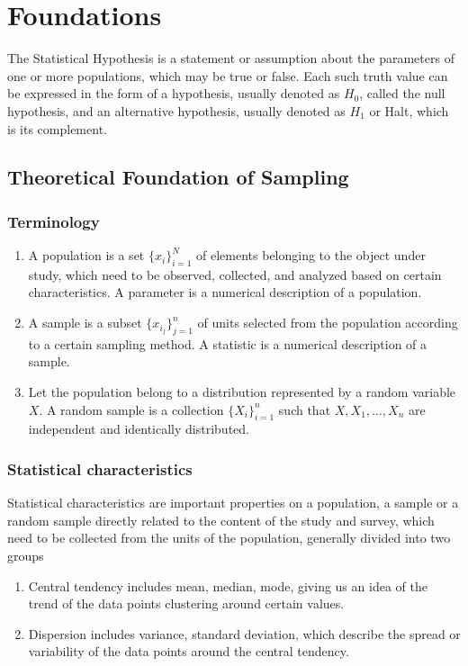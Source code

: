 \chapter{Foundations}

The Statistical Hypothesis is a statement or assumption about the parameters of one or more populations, which may be true or false. Each such truth value can be expressed in the form of a hypothesis, usually denoted as $H_0$, called the null hypothesis, and an alternative hypothesis, usually denoted as $H_1$ or Halt, which is its complement.

\section{Theoretical Foundation of Sampling}
\subsection{Terminology}
\begin{enumerate}
 \item A population is a set $\{x_i\}_{i=1}^N$ of elements belonging to the object under study, which need to be observed, collected, and analyzed based on certain characteristics. A parameter is a numerical description of a population.
 \item A sample is a subset $\{x_{i_j}\}_{j=1}^n$ of units selected from the population according to a certain sampling method. A statistic is a numerical description of a sample.
 \item Let the population belong to a distribution represented by a random variable $X$. A random sample is a collection $\{X_i\}_{i=1}^n$ such that $X,X_1,\ldots,X_n$ are independent and identically distributed.
\end{enumerate}

\subsection{Statistical characteristics}

Statistical characteristics are important properties on a population, a sample or a random sample directly related to the content of the study and survey, which need to be collected from the units of the population, generally divided into two groups

\begin{enumerate}
 \item Central tendency includes mean, median, mode, giving us an idea of the trend of the data points clustering around certain values.
 \item Dispersion includes variance, standard deviation, which describe the spread or variability of the data points around the central tendency.
\end{enumerate}

